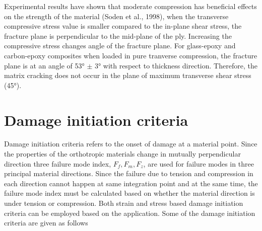 \documentclass[a4paper,12pt,twoside]{report}
\begin{document}
 Experimental results have shown that moderate compression has beneficial effects on the strength of the material (Soden et al., 1998), when the transverse compressive stress value is smaller compared to the in-plane shear stress, the fracture plane is perpendicular to the mid-plane of the ply. Increasing the compressive stress changes angle of the fracture plane. For glass-epoxy and carbon-epoxy composites when loaded in pure tranverse compression, the fracture plane is at an angle of 53° $\pm$ 3° with respect to thickness direction. Therefore, the matrix cracking does not occur in the plane of maximum transverse shear stress (45°).



\section{Damage initiation criteria}
\indent\indent\indent  Damage initiation criteria refers to the onset of damage at a material point. Since the properties of the orthotropic materials change in mutually perpendicular direction three failure mode index, $F_{f}, F_{m}, F_{z}$, are used for failure modes in three principal material directions. Since the failure due to tension and compression in each direction cannot happen at same integration point and at the same time, the failure mode index must be calculated based on whether the material direction is under tension or compression. Both strain and stress based damage initiation criteria can be employed based on the application. Some of the damage initiation criteria are given as follows
\end{document}
